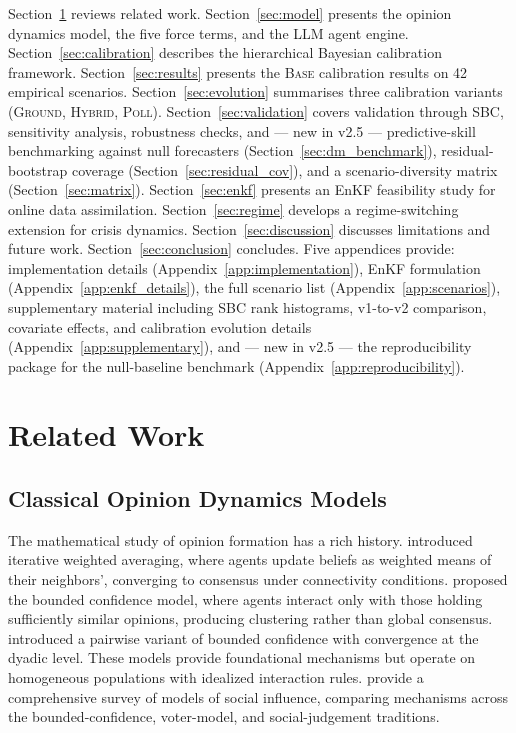 \documentclass[12pt]{article}
\begin{document}
Section~\ref{sec:related} reviews related work. Section~\ref{sec:model} presents the opinion dynamics model, the five force terms, and the LLM agent engine. Section~\ref{sec:calibration} describes the hierarchical Bayesian calibration framework. Section~\ref{sec:results} presents the \textsc{Base} calibration results on 42 empirical scenarios. Section~\ref{sec:evolution} summarises three calibration variants (\textsc{Ground}, \textsc{Hybrid}, \textsc{Poll}). Section~\ref{sec:validation} covers validation through SBC, sensitivity analysis, robustness checks, and --- new in v2.5 --- predictive-skill benchmarking against null forecasters (Section~\ref{sec:dm_benchmark}), residual-bootstrap coverage (Section~\ref{sec:residual_cov}), and a scenario-diversity matrix (Section~\ref{sec:matrix}). Section~\ref{sec:enkf} presents an EnKF feasibility study for online data assimilation. Section~\ref{sec:regime} develops a regime-switching extension for crisis dynamics. Section~\ref{sec:discussion} discusses limitations and future work. Section~\ref{sec:conclusion} concludes. Five appendices provide: implementation details (Appendix~\ref{app:implementation}), EnKF formulation (Appendix~\ref{app:enkf_details}), the full scenario list (Appendix~\ref{app:scenarios}), supplementary material including SBC rank histograms, v1-to-v2 comparison, covariate effects, and calibration evolution details (Appendix~\ref{app:supplementary}), and --- new in v2.5 --- the reproducibility package for the null-baseline benchmark (Appendix~\ref{app:reproducibility}).

\section{Related Work}
\label{sec:related}

\subsection{Classical Opinion Dynamics Models}

The mathematical study of opinion formation has a rich history. \citet{degroot1974} introduced iterative weighted averaging, where agents update beliefs as weighted means of their neighbors', converging to consensus under connectivity conditions. \citet{hegselmann2002} proposed the bounded confidence model, where agents interact only with those holding sufficiently similar opinions, producing clustering rather than global consensus. \citet{deffuant2000} introduced a pairwise variant of bounded confidence with convergence at the dyadic level. These models provide foundational mechanisms but operate on homogeneous populations with idealized interaction rules. \citet{flache2017} provide a comprehensive survey of models of social influence, comparing mechanisms across the bounded-confidence, voter-model, and social-judgement traditions.
\end{document}

